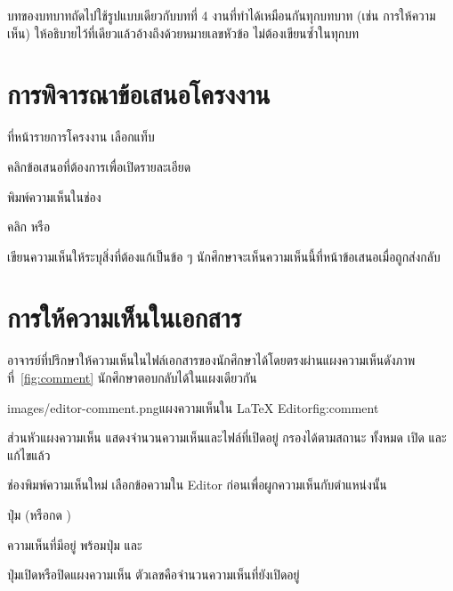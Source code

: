 \label{ch:advisor}

\begin{guide}
บทของบทบาทถัดไปใช้รูปแบบเดียวกับบทที่ 4 งานที่ทำได้เหมือนกันทุกบทบาท
(เช่น การให้ความเห็น) ให้อธิบายไว้ที่เดียวแล้วอ้างถึงด้วยหมายเลขหัวข้อ
ไม่ต้องเขียนซ้ำในทุกบท
\end{guide}

\section{การพิจารณาข้อเสนอโครงงาน}

\begin{steps}
  \item ที่หน้ารายการโครงงาน เลือกแท็บ 
  \item คลิกข้อเสนอที่ต้องการเพื่อเปิดรายละเอียด
  \item พิมพ์ความเห็นในช่อง 
  \item คลิก  หรือ 
\end{steps}

\begin{tip}
เขียนความเห็นให้ระบุสิ่งที่ต้องแก้เป็นข้อ ๆ นักศึกษาจะเห็นความเห็นนี้ที่หน้าข้อเสนอเมื่อถูกส่งกลับ
\end{tip}

\section{การให้ความเห็นในเอกสาร}
\label{sec:comment}

อาจารย์ที่ปรึกษาให้ความเห็นในไฟล์เอกสารของนักศึกษาได้โดยตรงผ่านแผงความเห็นดังภาพที่~\ref{fig:comment}
นักศึกษาตอบกลับได้ในแผงเดียวกัน

\begin{screenshot}{images/editor-comment.png}{แผงความเห็นใน LaTeX Editor}{fig:comment}
\end{screenshot}

\begin{calloutlist}
  \item ส่วนหัวแผงความเห็น แสดงจำนวนความเห็นและไฟล์ที่เปิดอยู่ กรองได้ตามสถานะ ทั้งหมด เปิด และแก้ไขแล้ว
  \item ช่องพิมพ์ความเห็นใหม่ เลือกข้อความใน Editor ก่อนเพื่อผูกความเห็นกับตำแหน่งนั้น
  \item ปุ่ม  (หรือกด )
  \item ความเห็นที่มีอยู่ พร้อมปุ่ม  และ 
  \item ปุ่มเปิดหรือปิดแผงความเห็น ตัวเลขคือจำนวนความเห็นที่ยังเปิดอยู่
\end{calloutlist}


